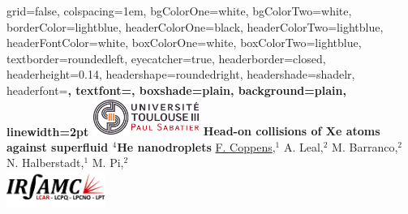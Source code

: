 \documentclass[portrait,a0paper,fontscale=0.277]{baposter}
\begin{document}
\begin{poster}%
  {
  grid=false,
  colspacing=1em,
  bgColorOne=white,
  bgColorTwo=white,
  borderColor=lightblue,
  headerColorOne=black,
  headerColorTwo=lightblue,
  headerFontColor=white,
  boxColorOne=white,
  boxColorTwo=lightblue,
  textborder=roundedleft,
  eyecatcher=true,
  headerborder=closed,
  headerheight=0.14\textheight,
  headershape=roundedright,
  headershade=shadelr,
  headerfont=\normalsize\bf\textsc, %
  textfont={\setlength{\parindent}{1.5em}},
  boxshade=plain,
  background=plain,
  linewidth=2pt
  }
  {\includegraphics[height=3.25em]{images/logo1-2.jpeg}} 
  {\bf\Large{Head-on collisions of Xe atoms against superfluid $^4$He nanodroplets}\vspace{0.5em}}
  {\normalsize{ \underline{F. Coppens},$^1$ A. Leal,$^2$ M. Barranco,$^2$ N. Halberstadt,$^1$ M. Pi,$^2$\vspace{0.5em}} \\
}
  {%
   \includegraphics[height=3.25em]{images/logo_irsamc}
  }

\vspace{-20px}
    \newcommand{\colouredcircle}{%
      \tikz{\useasboundingbox (-0.2em,-0.32em) rectangle(0.2em,0.32em); \draw[draw=black,fill=lightblue,line width=0.03em] (0,0) circle(0.18em);}}


\end{poster}
\end{document}
